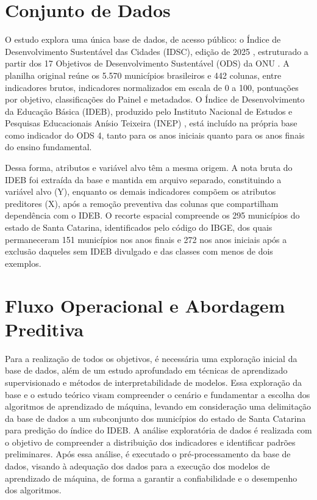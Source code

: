 \section{Conjunto de Dados}

O estudo explora uma única base de dados, de acesso público: o Índice de Desenvolvimento Sustentável das Cidades (IDSC), edição de 2025 \cite{idscbr2023}, estruturado a partir dos 17 Objetivos de Desenvolvimento Sustentável (ODS) da ONU \cite{onu2015agenda2030}. A planilha original reúne os 5.570 municípios brasileiros e 442 colunas, entre indicadores brutos, indicadores normalizados em escala de 0 a 100, pontuações por objetivo, classificações do Painel e metadados. O Índice de Desenvolvimento da Educação Básica (IDEB), produzido pelo Instituto Nacional de Estudos e Pesquisas Educacionais Anísio Teixeira (INEP) \cite{inep_ideb}, está incluído na própria base como indicador do ODS 4, tanto para os anos iniciais quanto para os anos finais do ensino fundamental.

Dessa forma, atributos e variável alvo têm a mesma origem. A nota bruta do IDEB foi extraída da base e mantida em arquivo separado, constituindo a variável alvo (Y), enquanto os demais indicadores compõem os atributos preditores (X), após a remoção preventiva das colunas que compartilham dependência com o IDEB. O recorte espacial compreende os 295 municípios do estado de Santa Catarina, identificados pelo código do IBGE, dos quais permaneceram 151 municípios nos anos finais e 272 nos anos iniciais após a exclusão daqueles sem IDEB divulgado e das classes com menos de dois exemplos.

\section{Fluxo Operacional e Abordagem Preditiva}

Para a realização de todos os objetivos, é necessária uma exploração inicial da base de dados, além de um estudo aprofundado em técnicas de aprendizado supervisionado e métodos de interpretabilidade de modelos. Essa exploração da base e o estudo teórico visam compreender o cenário e fundamentar a escolha dos algoritmos de aprendizado de máquina, levando em consideração uma delimitação da base de dados a um subconjunto dos municípios do estado de Santa Catarina para predição do índice do IDEB. A análise exploratória de dados é realizada com o objetivo de compreender a distribuição dos indicadores e identificar padrões preliminares. Após essa análise, é executado o pré-processamento da base de dados, visando à adequação dos dados para a execução dos modelos de aprendizado de máquina, de forma a garantir a confiabilidade e o desempenho dos algoritmos.

